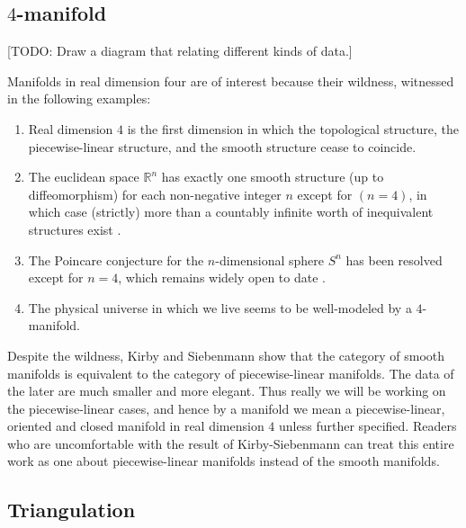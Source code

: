 \subsection{$4$-manifold}

[TODO: Draw a diagram that relating different kinds of data.]

Manifolds in real dimension four are of interest because their
wildness, witnessed in the following examples:

\begin{enumerate}
  \item Real dimension $4$ is the first dimension in which the
        topological structure, the piecewise-linear structure,
        and the smooth structure cease to coincide.
  \item The euclidean space $\mathbb{R}^{n}$ has exactly one
        smooth structure (up to diffeomorphism) for each
        non-negative integer $n$ except for $(n=4)$, in which
        case (strictly) more than a countably infinite worth of
        inequivalent structures exist \cite{?}.
  \item The Poincare conjecture for the $n$-dimensional sphere
        $S^{n}$ has been resolved except for $n=4$, which remains
        widely open to date \cite{?}.
  \item The physical universe in which we live seems to be
        well-modeled by a $4$-manifold.
\end{enumerate}

\noindent Despite the wildness, Kirby and Siebenmann
\cite{kirby-siebenmann} \cite{turaev-qiok-3-manifolds} show that
the category of smooth manifolds is equivalent to the category of
piecewise-linear manifolds. The data of the later are much
smaller and more elegant. Thus really we will be working on the
piecewise-linear cases, and hence by a manifold we mean a
piecewise-linear, oriented and closed manifold in real dimension
$4$ unless further specified. Readers who are uncomfortable with
the result of Kirby-Siebenmann can treat this entire work as one
about piecewise-linear manifolds instead of the smooth manifolds.

\subsection{Triangulation} \label{subsection/triangulation}

